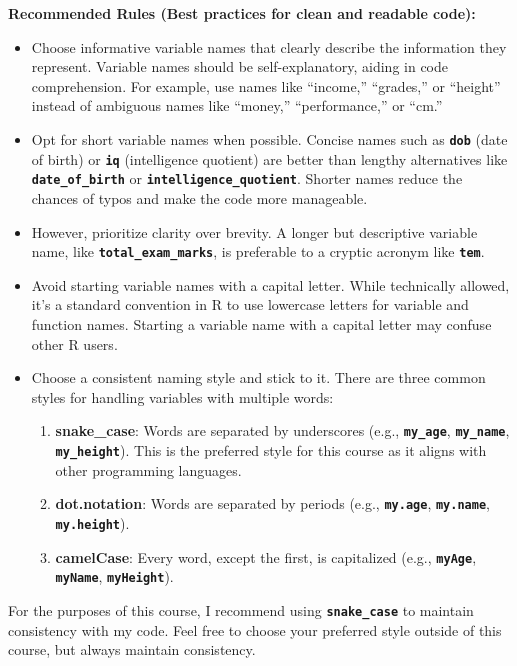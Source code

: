 \documentclass[
]{book}
\begin{document}
\textbf{Recommended Rules (Best practices for clean and readable code):}

\begin{itemize}
\item
  Choose informative variable names that clearly describe the information they represent. Variable names should be self-explanatory, aiding in code comprehension. For example, use names like ``income,'' ``grades,'' or ``height'' instead of ambiguous names like ``money,'' ``performance,'' or ``cm.''
\item
  Opt for short variable names when possible. Concise names such as \textbf{\texttt{dob}} (date of birth) or \textbf{\texttt{iq}} (intelligence quotient) are better than lengthy alternatives like \textbf{\texttt{date\_of\_birth}} or \textbf{\texttt{intelligence\_quotient}}. Shorter names reduce the chances of typos and make the code more manageable.
\item
  However, prioritize clarity over brevity. A longer but descriptive variable name, like \textbf{\texttt{total\_exam\_marks}}, is preferable to a cryptic acronym like \textbf{\texttt{tem}}.
\item
  Avoid starting variable names with a capital letter. While technically allowed, it's a standard convention in R to use lowercase letters for variable and function names. Starting a variable name with a capital letter may confuse other R users.
\item
  Choose a consistent naming style and stick to it. There are three common styles for handling variables with multiple words:

  \begin{enumerate}
  \def\labelenumi{\arabic{enumi}.}
  \item
    \textbf{snake\_case}: Words are separated by underscores (e.g., \textbf{\texttt{my\_age}}, \textbf{\texttt{my\_name}}, \textbf{\texttt{my\_height}}). This is the preferred style for this course as it aligns with other programming languages.
  \item
    \textbf{dot.notation}: Words are separated by periods (e.g., \textbf{\texttt{my.age}}, \textbf{\texttt{my.name}}, \textbf{\texttt{my.height}}).
  \item
    \textbf{camelCase}: Every word, except the first, is capitalized (e.g., \textbf{\texttt{myAge}}, \textbf{\texttt{myName}}, \textbf{\texttt{myHeight}}).
  \end{enumerate}
\end{itemize}

For the purposes of this course, I recommend using \textbf{\texttt{snake\_case}} to maintain consistency with my code. Feel free to choose your preferred style outside of this course, but always maintain consistency.
\end{document}
